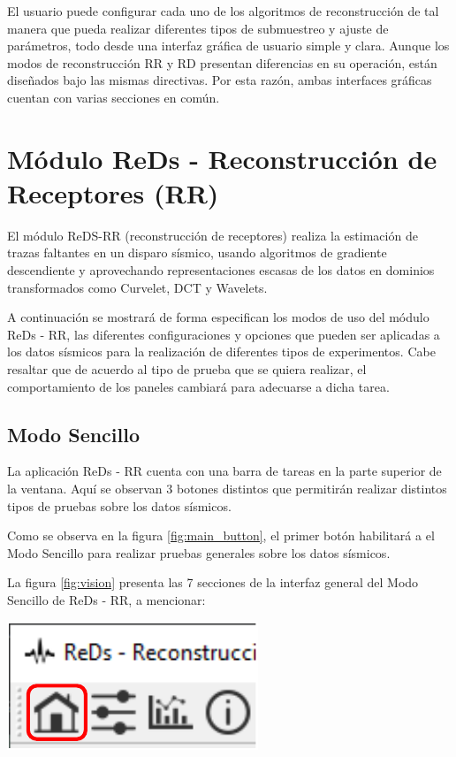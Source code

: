 \documentclass[12pt,twoside,letter]{ol-softwaremanual}
\newenvironment{Figure}
  {\par\medskip\noindent\minipage{\linewidth}}
  {\endminipage\par\medskip}
\begin{document}
El usuario puede configurar cada uno de los algoritmos de reconstrucción de tal manera que pueda realizar diferentes tipos de submuestreo y ajuste de parámetros, todo desde una interfaz gráfica de usuario simple y clara. Aunque los modos de reconstrucción RR y RD presentan diferencias en su operación, están diseñados bajo las mismas directivas. Por esta razón, ambas interfaces gráficas cuentan con varias secciones en común.



\cleardoublepage

\section{Módulo ReDs - Reconstrucción de Receptores (RR)}

El módulo ReDS-RR (reconstrucción de receptores) realiza la estimación de trazas faltantes en un disparo sísmico, usando algoritmos de gradiente descendiente y aprovechando representaciones escasas de los datos en dominios transformados como Curvelet, DCT y Wavelets.

A continuación se mostrará de forma especifican los modos de uso del módulo ReDs - RR, las diferentes configuraciones y opciones que pueden ser aplicadas a los datos sísmicos para la realización de diferentes tipos de experimentos. Cabe resaltar que de acuerdo al tipo de prueba que se quiera realizar, el comportamiento de los paneles cambiará para adecuarse a dicha tarea.

\subsection{Modo Sencillo}

La aplicación ReDs - RR cuenta con una barra de tareas en la parte superior de la ventana. Aquí se observan 3 botones distintos que permitirán realizar distintos tipos de pruebas sobre los datos sísmicos.

\begin{multicols}{2}
	
	Como se observa en la figura \ref{fig:main_button}, el primer botón habilitará a el Modo Sencillo para realizar pruebas generales sobre los datos sísmicos.
	
	La figura \ref{fig:vision} presenta las 7 secciones de la interfaz general del Modo Sencillo de ReDs - RR, a mencionar:
	
	\begin{Figure}
		\centering
		\includegraphics[width=0.5\linewidth]{single-tab}
		\label{fig:main_button}
	\end{Figure}
	
\end{multicols}
\end{document}
